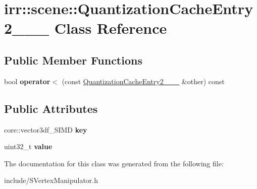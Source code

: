 \hypertarget{classirr_1_1scene_1_1QuantizationCacheEntry2__10__10__10}{}\section{irr\+:\+:scene\+:\+:Quantization\+Cache\+Entry2\+\_\+\_\+\_ Class Reference}
\label{classirr_1_1scene_1_1QuantizationCacheEntry2__10__10__10}
\subsection*{Public Member Functions}
\begin{DoxyCompactItemize}
\item 
bool {\bfseries operator$<$} (const \hyperlink{classirr_1_1scene_1_1QuantizationCacheEntry2__10__10__10}{Quantization\+Cache\+Entry2\+\_\+\_\+\_} \&other) const \hypertarget{classirr_1_1scene_1_1QuantizationCacheEntry2__10__10__10_a75d1e6d3851bb745e3abc414e38ea088}{}\label{classirr_1_1scene_1_1QuantizationCacheEntry2__10__10__10_a75d1e6d3851bb745e3abc414e38ea088}

\end{DoxyCompactItemize}
\subsection*{Public Attributes}
\begin{DoxyCompactItemize}
\item 
core\+::vector3df\+\_\+\+S\+I\+MD {\bfseries key}\hypertarget{classirr_1_1scene_1_1QuantizationCacheEntry2__10__10__10_a92b764212aa2cbeb7965389445fcefe7}{}\label{classirr_1_1scene_1_1QuantizationCacheEntry2__10__10__10_a92b764212aa2cbeb7965389445fcefe7}

\item 
uint32\+\_\+t {\bfseries value}\hypertarget{classirr_1_1scene_1_1QuantizationCacheEntry2__10__10__10_a669bd5a645b8edd5f8a7da185a6d16f9}{}\label{classirr_1_1scene_1_1QuantizationCacheEntry2__10__10__10_a669bd5a645b8edd5f8a7da185a6d16f9}

\end{DoxyCompactItemize}


The documentation for this class was generated from the following file\+:\begin{DoxyCompactItemize}
\item 
include/S\+Vertex\+Manipulator.\+h\end{DoxyCompactItemize}
